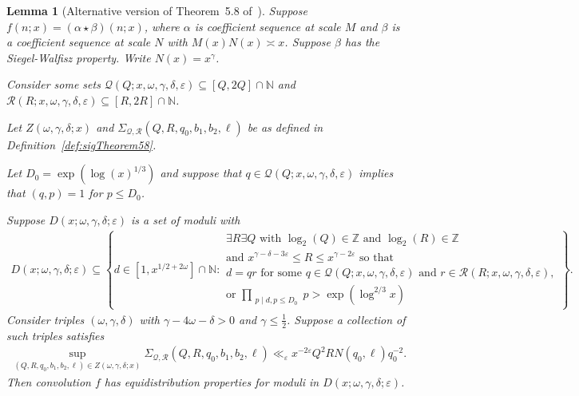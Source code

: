 \documentclass{amsart}
\newtheorem{lemma}{Lemma}
\numberwithin{equation}{section}
\begin{document}
\begin{lemma}[Alternative version of Theorem~5.8 of~\cite{Polymath:2014:EDZ}] \label{lem:theorem58}
Suppose $f(n;x) = (\alpha \star \beta)(n;x)$, where $\alpha$ is  coefficient sequence at scale $M$ and $\beta$ is a  coefficient sequence at scale $N$ with $M(x) N(x) \asymp x$. Suppose  $\beta$ has the Siegel-Walfisz property. Write $N(x) = x^\gamma$.

\smallskip
Consider some sets $\mathcal{Q}(Q;x,\omega,\gamma,\delta,\varepsilon) \subseteq [Q,2Q] \cap \mathbb{N}$ and $\mathcal{R}(R;x,\omega,\gamma,\delta,\varepsilon) \subseteq [R,2R] \cap \mathbb{N}$.

Let $Z(\omega, \gamma, \delta; x)$ and $\Sigma_{\mathcal{Q},\mathcal{R}}(Q,R,q_0,b_1,b_2,\ell)$ be as defined in Definition~\ref{def:sigTheorem58}.

Let $D_0 = \exp(\log(x)^{1/3})$ and suppose that $q \in \mathcal{Q}(Q;x,\omega,\gamma,\delta,\varepsilon)$ implies that $(q,p)=1$ for $p \leq D_0$.

\medskip
 Suppose  $D(x;\omega,\gamma,\delta;\varepsilon)$ is a set of moduli with 
\begin{align*}
D(x;\omega,\gamma,\delta;\varepsilon)\subseteq \left\{d \in  [1, x^{1/2+2\omega}]\cap \mathbb{N}: \begin{array}{l} \exists R \exists Q \mbox{ with }  \log_2(Q) \in \mathbb{Z} \mbox{ and }  \log_2(R) \in \mathbb{Z} \\  \mbox{and } x^{\gamma-\delta -3\varepsilon} \leq R \leq x^{\gamma - 2\varepsilon}  \mbox{ so that } \\ d=qr \mbox{ for some }  q \in \mathcal{Q}(Q;x,\omega,\gamma,\delta,\varepsilon) \mbox{ and } r\in \mathcal{R}(R;x,\omega,\gamma,\delta,\varepsilon), \\
 \mbox{or } \prod_{\substack{ p \mid d,  p \leq D_0}} p > \exp(\log^{2/3} x)    
\end{array} \right\}.
\end{align*}
Consider triples   $(\omega,\gamma,\delta)$ with  $
\gamma-4\omega  -\delta  >0$ and $\gamma \leq \frac{1}{2}$. Suppose a collection of such triples   satisfies   
\begin{align*}
\sup_{(Q,R,q_0,b_1,b_2,\ell) \in Z(\omega,\gamma,\delta;x)}\Sigma_{\mathcal{Q},\mathcal{R}}(Q,R,q_0,b_1,b_2,\ell) \ll_\varepsilon x^{-2\varepsilon} Q^2RN (q_0, \ell) q_0^{-2}.
\end{align*}
Then convolution $f$ has equidistribution properties for moduli in $D(x;\omega,\gamma,\delta;\varepsilon)$.
\end{lemma}
\end{document}
